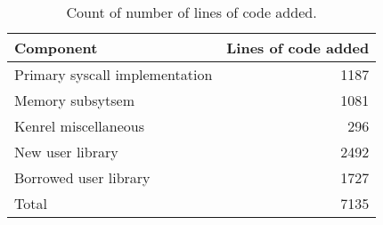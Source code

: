 
\begin{table}[t]
\begin{tabularx}{233pt}{l | r}
Component & Lines of code added \\
\hline
Primary syscall implementation & 1187 \\
Memory subsytsem & 1081 \\
Kenrel miscellaneous & 296 \\
New user library & 2492 \\
Borrowed user library & 1727 \\
\hline
Total & 7135
\end{tabularx}
\caption{Count of number of lines of code added.}
\label{tab:loc}
\end{table}

\endinput

